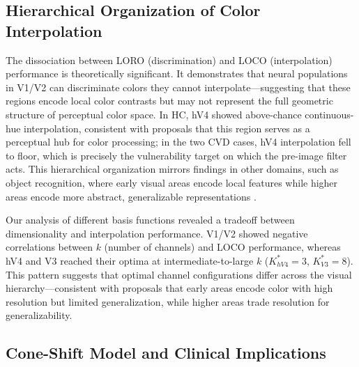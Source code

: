 \subsection{Hierarchical Organization of Color Interpolation}

The dissociation between LORO (discrimination) and LOCO (interpolation) performance is theoretically significant. It demonstrates that neural populations in V1/V2 can discriminate colors they cannot interpolate---suggesting that these regions encode local color contrasts but may not represent the full geometric structure of perceptual color space. %
In HC, hV4 showed above-chance continuous-hue interpolation, consistent with proposals that this region serves as a perceptual hub for color processing; in the two CVD cases, hV4 interpolation fell to floor, which is precisely the vulnerability target on which the pre-image filter acts. This hierarchical organization mirrors findings in other domains, such as object recognition, where early visual areas encode local features while higher areas encode more abstract, generalizable representations \cite{guntupalli2016}.

Our analysis of different basis functions revealed a tradeoff between dimensionality and interpolation performance. V1/V2 showed negative correlations between $k$ (number of channels) and LOCO performance, whereas hV4 and V3 reached their optima at intermediate-to-large $k$ ($K^{\ast}_{hV4} = 3$, $K^{\ast}_{V3} = 8$). This pattern suggests that optimal channel configurations differ across the visual hierarchy---consistent with proposals that early areas encode color with high resolution but limited generalization, while higher areas trade resolution for generalizability.

\subsection{Cone-Shift Model and Clinical Implications}

